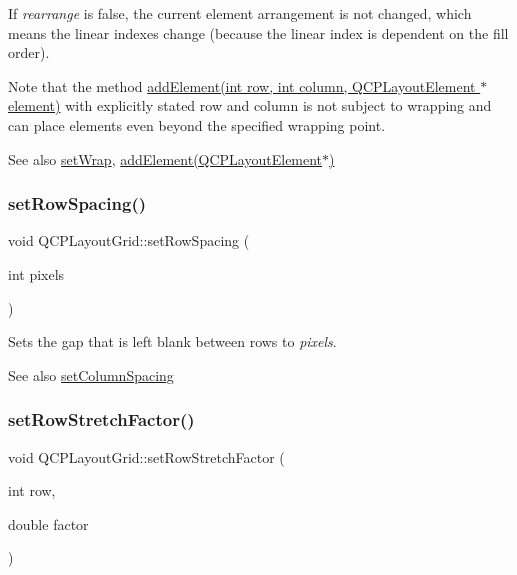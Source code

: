 If {\itshape rearrange} is false, the current element arrangement is not changed, which means the linear indexes change (because the linear index is dependent on the fill order).

Note that the method \hyperlink{class_q_c_p_layout_grid_adff1a2ca691ed83d2d24a4cd1fe17012}{add\+Element(int row, int column, Q\+C\+P\+Layout\+Element $\ast$element)} with explicitly stated row and column is not subject to wrapping and can place elements even beyond the specified wrapping point.

\begin{DoxySeeAlso}{See also}
\hyperlink{class_q_c_p_layout_grid_ab36af18d77e4428386d02970382ee598}{set\+Wrap}, \hyperlink{class_q_c_p_layout_grid_a4c44025dd25acd27e053cadfd448ad7b}{add\+Element(\+Q\+C\+P\+Layout\+Element$\ast$)} 
\end{DoxySeeAlso}
\mbox{\label{class_q_c_p_layout_grid_aaef2cd2d456197ee06a208793678e436}} 
\subsubsection{\texorpdfstring{set\+Row\+Spacing()}{setRowSpacing()}}
{\footnotesize\ttfamily void Q\+C\+P\+Layout\+Grid\+::set\+Row\+Spacing (\begin{DoxyParamCaption}\item[{int}]{pixels }\end{DoxyParamCaption})}

Sets the gap that is left blank between rows to {\itshape pixels}.

\begin{DoxySeeAlso}{See also}
\hyperlink{class_q_c_p_layout_grid_a3a49272aba32bb0fddc3bb2a45a3dba0}{set\+Column\+Spacing} 
\end{DoxySeeAlso}
\mbox{\label{class_q_c_p_layout_grid_a7b0273de5369bd93d942edbaf5b166ec}} 
\subsubsection{\texorpdfstring{set\+Row\+Stretch\+Factor()}{setRowStretchFactor()}}
{\footnotesize\ttfamily void Q\+C\+P\+Layout\+Grid\+::set\+Row\+Stretch\+Factor (\begin{DoxyParamCaption}\item[{int}]{row,  }\item[{double}]{factor }\end{DoxyParamCaption})}

